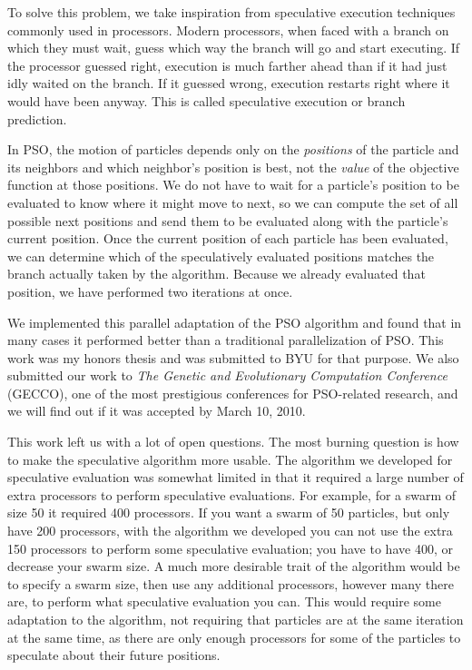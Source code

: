 \documentclass[onecolumn, 12pt]{article}
\begin{document}
To solve this problem, we take inspiration from speculative execution
techniques commonly used in processors.  Modern processors, when faced with a
branch on which they must wait, guess which way the branch will go and start
executing.  If the processor guessed right, execution is much farther ahead
than if it had just idly waited on the branch.  If it guessed wrong, execution
restarts right where it would have been anyway.  This is called speculative
execution or branch prediction.

In PSO, the motion of particles depends only on the \emph{positions} of the
particle and its neighbors and which neighbor's position is best, not the
\emph{value} of the objective function at those positions.   We do not have to
wait for a particle's position to be evaluated to know where it might move to
next, so we can compute the set of all possible next positions and send them to
be evaluated along with the particle's current position.  Once the current
position of each particle has been evaluated, we can determine which of the
speculatively evaluated positions matches the branch actually taken by the
algorithm.  Because we already evaluated that position, we have performed two
iterations at once.

We implemented this parallel adaptation of the PSO algorithm and found that in
many cases it performed better than a traditional parallelization of PSO.  This
work was my honors thesis and was submitted to BYU for that purpose.  We also
submitted our work to \emph{The Genetic and Evolutionary Computation
Conference} (GECCO), one of the most prestigious conferences for PSO-related
research, and we will find out if it was accepted by March 10, 2010.

This work left us with a lot of open questions.  The most burning question is
how to make the speculative algorithm more usable.  The algorithm we developed
for speculative evaluation was somewhat limited in that it required a large
number of extra processors to perform speculative evaluations.  For example,
for a swarm of size 50 it required 400 processors.  If you want a swarm of 50
particles, but only have 200 processors, with the algorithm we developed you
can not use the extra 150 processors to perform some speculative evaluation;
you have to have 400, or decrease your swarm size.  A much more desirable trait
of the algorithm would be to specify a swarm size, then use any additional
processors, however many there are, to perform what speculative evaluation you
can.  This would require some adaptation to the algorithm, not requiring that
particles are at the same iteration at the same time, as there are only enough
processors for some of the particles to speculate about their future positions.
\end{document}
